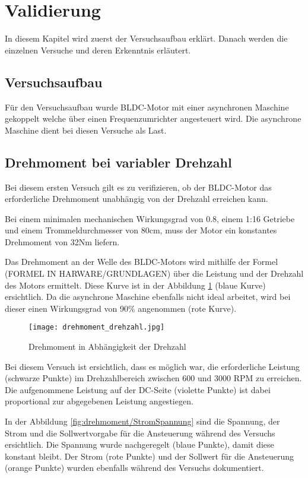 \section{Validierung}
In diesem Kapitel wird zuerst der Versuchsaufbau erklärt. Danach werden die einzelnen Versuche und deren Erkenntnis erläutert.

\subsection{Versuchsaufbau}
Für den Versuchsaufbau wurde BLDC-Motor mit einer asynchronen Maschine gekoppelt welche über einen Frequenzumrichter angesteuert wird. Die asynchrone Maschine dient bei diesen Versuche als Last.


\subsection{Drehmoment bei variabler Drehzahl}
Bei diesem ersten Versuch gilt es zu verifizieren, ob der BLDC-Motor das erforderliche Drehmoment unabhängig von der Drehzahl erreichen kann.

Bei einem minimalen mechanischen Wirkungsgrad von 0.8, einem 1:16 Getriebe und einem Trommeldurchmesser von 80cm, muss der Motor ein konstantes Drehmoment von 32Nm liefern.

Das Drehmoment an der Welle des BLDC-Motors wird mithilfe der Formel (FORMEL IN HARWARE/GRUNDLAGEN) über die Leistung und der Drehzahl des Motors ermittelt. Diese Kurve ist in der Abbildung \ref{fig:drehmoment/drehzahl} (blaue Kurve) ersichtlich. Da die asynchrone Maschine ebenfalls nicht ideal arbeitet, wird bei dieser einen Wirkungsgrad von 90\% angenommen (rote Kurve). 

\begin{figure}[H]
	\centering
	\texttt{[image: drehmoment\_drehzahl.jpg]}
	\caption{Drehmoment in Abhängigkeit der Drehzahl}\label{fig:drehmoment/drehzahl}
\end{figure}

Bei diesem Versuch ist ersichtlich, dass es möglich war, die erforderliche Leistung (schwarze Punkte) im Drehzahlbereich zwischen 600 und 3000 RPM zu erreichen. Die aufgenommene Leistung auf der DC-Seite (violette Punkte) ist dabei proportional zur abgegebenen Leistung angestiegen.

In der Abbildung \ref{fig:drehmoment/StromSpannung} sind die Spannung, der Strom und die Sollwertvorgabe für die Ansteuerung während des Versuchs ersichtlich. Die Spannung wurde nachgeregelt (blaue Punkte), damit diese konstant bleibt. Der Strom (rote Punkte) und der Sollwert für die Ansteuerung (orange Punkte) wurden ebenfalls während des Versuchs dokumentiert.

